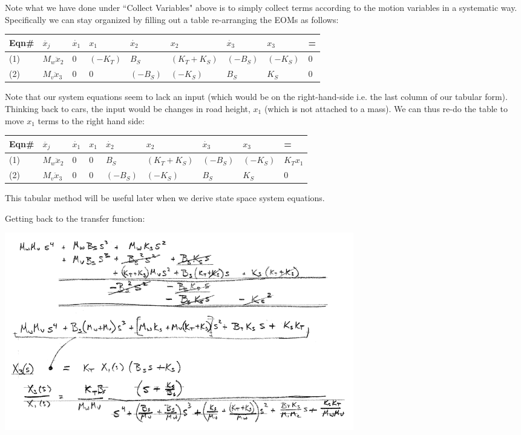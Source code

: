 %
\begin{ExampleCont}
Note what we have done under ``Collect Variables" above is to simply collect terms according to the motion variables in a systematic
way.  Specifically we can stay organized by filling
out a table re-arranging the EOMs as follows:\vspace{0.3in}



\renewcommand\arraystretch{1.5}%


\begin{tabular}{|p{0.35in}|p{0.55in}|p{0.55in}|p{0.55in}|p{0.35in}|p{0.65in}|p{0.55in}|p{0.55in}|p{0.35in}|}\hline
  Eqn\# & $\ddot{x_j}$ & $\dot{x_1}$ & $x_1$  & $\dot{x_2}$ & ${x_2} $& $\dot{x_3}$ & ${x_3} $ &  = \\ \hline
  (1)   & $M_w\ddot{x}_2$ & 0 & $(-K_T)$ & $B_S$    & $(K_T+K_S)$ & $(-B_S)$ & $(-K_S)$ & 0  \\ \hline
  (2)   & $M_v\ddot{x}_3$ & 0 & 0        & $(-B_S)$ & $(-K_S)$    & $B_S$    & $K_S$    & 0 \\ \hline
\end{tabular}

Note that our system equations seem to lack an input (which would be on the right-hand-side i.e. the
last column of our tabular form).  Thinking back to cars, the input would be changes in road height,
$x_1$ (which is not attached to a mass).  We can thus re-do the table to move $x_1$ terms to
the right hand side:

\begin{tabular}{|p{0.35in}|p{0.55in}|p{0.55in}|p{0.55in}|p{0.35in}|p{0.65in}|p{0.55in}|p{0.55in}|p{0.35in}|}\hline
  Eqn\# & $\ddot{x_j}$ & $\dot{x_1}$ & $x_1$  & $\dot{x_2}$ & ${x_2} $& $\dot{x_3}$ & ${x_3} $ &  = \\ \hline
  (1)   & $M_w\ddot{x}_2$ & 0 & $0$ & $B_S$    & $(K_T+K_S)$ & $(-B_S)$ & $(-K_S)$ & $K_Tx_1$ \\ \hline
  (2)   & $M_v\ddot{x}_3$ & 0 & 0        & $(-B_S)$ & $(-K_S)$    & $B_S$    & $K_S$    & 0 \\ \hline
\end{tabular}
This tabular method will be useful later when we derive state space system equations.

Getting back to the transfer function:

\includegraphics[width=6.0in]{figs02/00961.png}


\end{ExampleCont}
